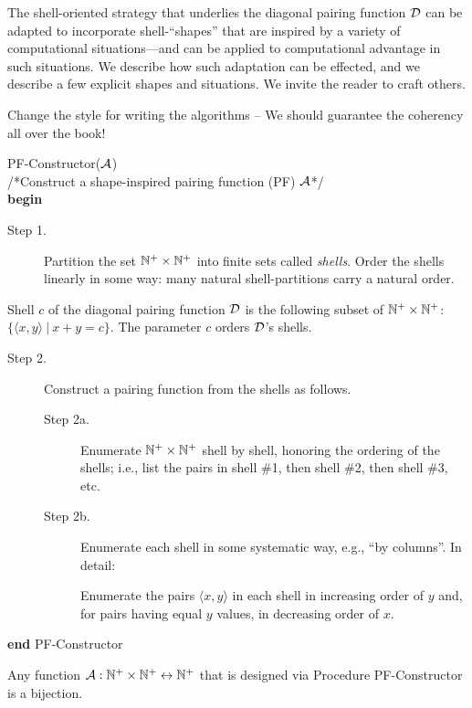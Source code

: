 The shell-oriented strategy that underlies the diagonal pairing function $\mbox{$\cal D$}$ can be adapted to incorporate shell-``shapes'' that are inspired by a variety of computational situations---and can be applied to computational advantage in such situations.  We describe how such adaptation can be effected, and we describe a few explicit shapes and situations.  We invite the reader to craft others.

\medskip

{\Denis Change the style for writing the algorithms -- We should guarantee the coherency all over the book!}

 {\sf PF-Constructor}($\mbox{$\cal A$}$) \\
/*Construct a shape-inspired pairing function (PF) $\mbox{$\cal A$}$*/  \\
{\bf begin}
\begin{description}
\item[Step 1.]
%
Partition the set $\mathbb{N}^+ \times \mathbb{N}^+$ into finite sets called {\it shells}.  Order the shells linearly in some way: many natural shell-partitions carry a natural order.
\end{description}
Shell $c$ of the diagonal pairing function $\mbox{$\cal D$}$ is the following subset of $\mathbb{N}^+ \times \mathbb{N}^+$: $\{ \langle x,y \rangle \ | \ x+y = c \}$.  The parameter $c$ orders $\mbox{$\cal D$}$'s shells.

\begin{description}
\item[Step 2.]
Construct a pairing function from the shells as follows.
  \begin{description}
  \item[Step 2a.]
Enumerate $\mathbb{N}^+ \times \mathbb{N}^+$ shell by shell, honoring the ordering of the shells; i.e., list the pairs in shell \#1, then shell \#2, then shell \#3, etc.
  \item[Step 2b.]
Enumerate each shell in some systematic way, e.g., ``by columns''.  In detail:

\smallskip

Enumerate the pairs $\langle x,y \rangle$ in each shell in increasing order of $y$ and, for pairs having equal $y$ values, in decreasing order of $x$.
  \end{description}
\end{description}
{\bf end} {\sf PF-Constructor}

\medskip

\begin{prop}
\label{thm:PF-construct}
Any function $\mbox{$\cal A$}: \mathbb{N}^+ \times \mathbb{N}^+ \leftrightarrow \mathbb{N}^+$ that is designed via Procedure {\small\sf PF-Constructor} is a bijection.
\end{prop}

